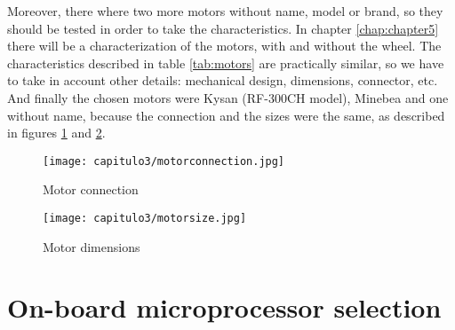 Moreover, there where two more motors without name, model or brand, so they should be tested in order to take the characteristics. In chapter \ref{chap:chapter5} there will be a characterization of the motors, with and without the wheel. The characteristics described in table \ref{tab:motors} are practically similar, so we have to take in account other details: mechanical design, dimensions, connector, etc. And finally the chosen motors were Kysan (RF-300CH model), Minebea and one without name, because the connection and the sizes were the same, as described in figures \ref{fig:motorconnection} and \ref{fig:motorsize}.

\begin{figure}[H]
	\centering
		\texttt{[image: capitulo3/motorconnection.jpg]}
	\caption{Motor connection}
	\label{fig:motorconnection}
\end{figure}

\begin{figure}[H]
	\centering
		\texttt{[image: capitulo3/motorsize.jpg]}
	\caption{Motor dimensions \cite{Minebea}}
	\label{fig:motorsize}
\end{figure}

\section{On-board microprocessor selection}\label{sec:microprocessor}

